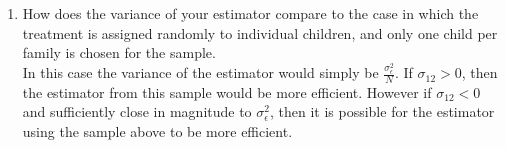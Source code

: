 \documentclass[12pt]{article}
\newcommand\eps{\epsilon}
\numberwithin{equation}{section}
\numberwithin{figure}{section}
\numberwithin{table}{section}
\begin{document}
\begin{enumerate}
{  }
\item How does the variance of your estimator compare to the case in which the treatment is assigned randomly to individual children, and only one child per family is chosen for the sample. \\
  {\color{blue} In this case the variance of the estimator would simply be $\frac{\sigma^2_\eps}{N}$. If $\sigma_{12}>0$, then the estimator from this sample would be more efficient. However if $\sigma_{12}<0$ and sufficiently close in magnitude to $\sigma^2_\eps$, then it is possible for the estimator using the sample above to be more efficient.
    }

\end{enumerate}
\end{document}
